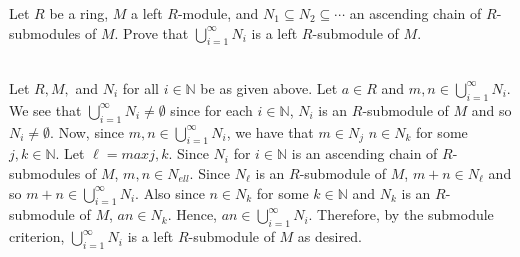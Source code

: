 Let $R$ be a ring, $M$ a left $R$-module, and $N_1\subseteq N_2\subseteq\cdots$ an ascending chain of
$R$-submodules of $M$. Prove that $\bigcup_{i=1}^{\infty}N_i$ is a left $R$-submodule of $M$.

\begin{solution}\renewcommand{\qedsymbol}{}\ \\
    Let $R, M,$ and $N_i$ for all $i\in\mathbb{N}$ be as given above. Let $a\in R$ and
    $m,n\in\bigcup_{i=1}^{\infty}N_i$. We see that $\bigcup_{i=1}^{\infty}N_i\neq\emptyset$ since for
    each $i\in\mathbb{N}$, $N_i$ is an $R$-submodule of $M$ and so $N_i\neq\emptyset$. Now, since
    $m,n\in\bigcup_{i=1}^{\infty}N_i$, we have that $m\in N_j$ $n\in N_k$ for some $j,k\in\mathbb{N}$.
    Let $\ell=max{j,k}$. Since $N_i$ for $i\in\mathbb{N}$ is an ascending chain of $R$-submodules of
    $M$, $m,n\in N_{ell}$. Since $N_{\ell}$ is an $R$-submodule of $M$, $m+n\in N_{\ell}$ and so
    $m+n\in\bigcup_{i=1}^{\infty}N_i$. Also since $n\in N_k$ for some $k\in\mathbb{N}$ and $N_k$ is an
    $R$-submodule of $M$, $an\in N_k$. Hence, $an\in\bigcup_{i=1}^{\infty}N_i$. Therefore, by the
    submodule criterion, $\bigcup_{i=1}^{\infty}N_i$ is a left $R$-submodule of $M$ as desired.

\end{solution}